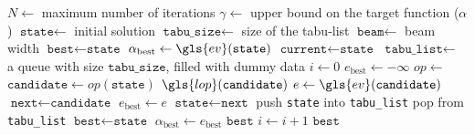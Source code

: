 \begin{algorithmic}[1]
	\Require $N\gets$ maximum number of iterations
    \Require $\gamma\gets$ upper bound on the target function ($\alpha$) 
	\Require $\texttt{state}\gets$ initial solution
	\Require $\texttt{tabu\_size} \gets$ size of the tabu-list
	\Require $\texttt{beam} \gets$ beam width 
		\State $\texttt{best} \gets \texttt{state}$
		\State $\alpha_{\text{best}} \gets \gls{ev}(\texttt{state})$
		\State $\texttt{current} \gets \texttt{state}$
        \State $\texttt{tabu\_list} \gets $ a  queue with size $\texttt{tabu\_size}$, filled with dummy data
		\State $i \gets 0$
			\State $e_{\text{best}} \gets -\infty$
                \State $op\gets$
                \State $\texttt{candidate} \gets op(\texttt{state})$
                \State $\gls{lop}(\texttt{candidate})$
                \State $e \gets \gls{ev}(\texttt{candidate})$ 
                    \State $\texttt{next} \gets \texttt{candidate}$
					\State $e_{\text{best}} \gets e$
				\EndIf
            \EndFor
            \State $\texttt{state} \gets \texttt{next}$
			\State push \texttt{state} into \texttt{tabu\_list}
			\State pop from \texttt{tabu\_list}
				\State $\texttt{best} \gets \texttt{state}$
				\State $\alpha_{\text{best}} \gets e_{\text{best}}$
			\EndIf
				\State \Return $\texttt{best}$
			\EndIf
			\State $i\gets i+1$
		\EndWhile
		\State \Return $\texttt{best}$
	\EndProcedure
\end{algorithmic}

